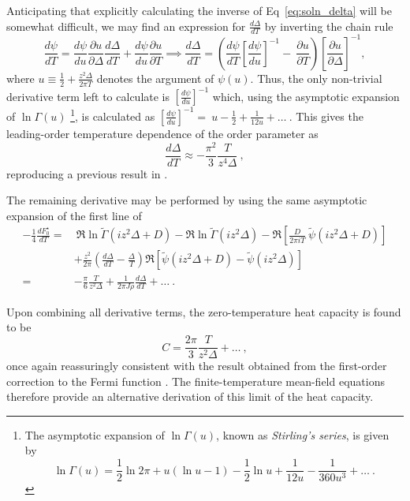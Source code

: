 \documentclass[12pt]{article}
\begin{document}
Anticipating that explicitly calculating the inverse of Eq~\eqref{eq:soln_delta} will be somewhat difficult, we may find an expression for $ \frac{d \Delta}{d T} $ by inverting the chain rule $$ \frac{d \psi}{dT} = \frac{d \psi}{du} \frac{\partial u}{\partial \Delta} \frac{d \Delta}{d T} + \frac{d \psi}{du} \frac{\partial u}{\partial T} \implies \frac{d \Delta}{d T} = \left( \frac{d \psi}{dT} \left[ \frac{d \psi}{d u} \right]^{-1} - ~ \frac{\partial u}{\partial T} \right) \left[ \frac{\partial u}{\partial \Delta} \right]^{-1} ,$$ where $ u \equiv \frac{1}{2} + \frac{z^2 \Delta}{2 \pi T} $ denotes the argument of $ \psi(u) $. Thus, the only non-trivial derivative term left to calculate is $ \left[ \frac{d \psi}{d u} \right]^{-1} $ which, using the asymptotic expansion of $ \ln{\Gamma(u)} $ \footnote{The asymptotic expansion of $ \ln{\Gamma(u)} $, known as \textit{Stirling's series}, is given by $$ \ln{\Gamma(u)} = \frac{1}{2} \ln{2 \pi} + u (\ln{u} - 1) - \frac{1}{2} \ln{u} + \frac{1}{12u} - \frac{1}{360 u^3} + \ldots ~. $$}, is calculated as $ \left[ \frac{d \psi}{du} \right]^{-1} = ~ u - \frac{1}{2} + \frac{1}{12 u} + \ldots ~ . $ This gives the leading-order temperature dependence of the order parameter as
\begin{equation}
\frac{d \Delta}{d T} \approx - \frac{\pi^2}{3} \frac{T}{z^4 \Delta} ~ ,
\label{eq:delta_derivative}
\end{equation}
reproducing a previous result in \cite{Draft}.

The remaining derivative may be performed by using the same asymptotic expansion of the first line of
\begin{align*}
- \frac{1}{4} \frac{d F_{0}^{\star}}{dT} =& ~ \Re \ln{\widetilde{\Gamma}(i z^2 \Delta + D)} - \Re \ln{\widetilde{\Gamma}(i z^2 \Delta)} - \Re{\left[ \frac{D}{2 \pi i T} ~ \widetilde{\psi}(i z^2 \Delta + D) \right]} \\
& + \frac{z^2}{2 \pi} \left( \frac{d \Delta}{d T} - \frac{\Delta}{T} \right) \Re{\left[ \widetilde{\psi}(i z^2 \Delta + D) - \widetilde{\psi}(i z^2 \Delta) \right]} \\
=& - \frac{\pi}{6} \frac{T}{z^2 \Delta} + \frac{1}{2 \pi J \rho} \frac{d \Delta}{d T} + \ldots ~ .
\end{align*}

Upon combining all derivative terms, the zero-temperature heat capacity is found to be
\begin{equation}
C = \frac{2 \pi}{3} \frac{T}{z^2 \Delta} + \ldots ~ ,
\label{eq:heat_capacity}
\end{equation}
once again reassuringly consistent with the result obtained from the first-order correction to the Fermi function \cite{Draft}. The finite-temperature mean-field equations therefore provide an alternative derivation of this limit of the heat capacity.
\end{document}
